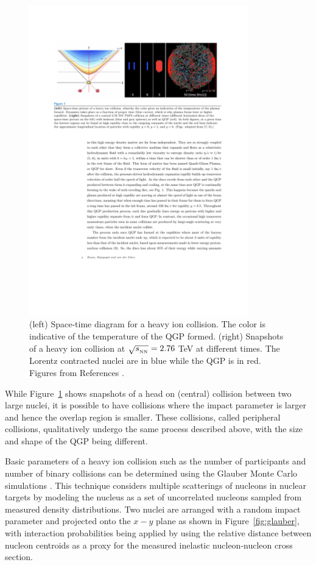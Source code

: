\begin{figure}[htbp]
\begin{center}
\includegraphics[width=0.85\textwidth]{figures/theory/qgp_formation}
\caption{(left) Space-time diagram for a heavy ion collision. The color is indicative of the temperature of the QGP formed. (right) Snapshots of a heavy ion collision at $\mbox{$\sqrt{s_{_\text{NN}}}$} = 2.76$ TeV at different times. The Lorentz contracted nuclei are in blue while the QGP is in red. Figures from References \cite{7, 8}.  }
\label{fig:qgp_form}
\end{center}
\end{figure}

While Figure~\ref{fig:qgp_form} shows snapshots of a head on (central) collision between two large nuclei, it is possible to have collisions where the impact parameter is larger and hence the overlap region is smaller. These collisions, called peripheral collisions, qualitatively undergo the same process described above, with the size and shape of the QGP being different.

Basic parameters of a heavy ion collision such as the number of participants \Npart and number of binary collisions \Ncoll can be determined using the Glauber Monte Carlo simulations \cite{doi:10.1146/annurev.nucl.57.090506.123020}. This technique  considers multiple scatterings of nucleons in nuclear targets by modeling the nucleus as a set of uncorrelated nucleons sampled from measured density distributions. Two nuclei are arranged with a random impact parameter and projected onto the $x-y$ plane as shown in Figure~\ref{fig:glauber}, with interaction probabilities being applied by using the relative distance between nucleon centroids as a proxy for the measured inelastic nucleon-nucleon cross section. 


